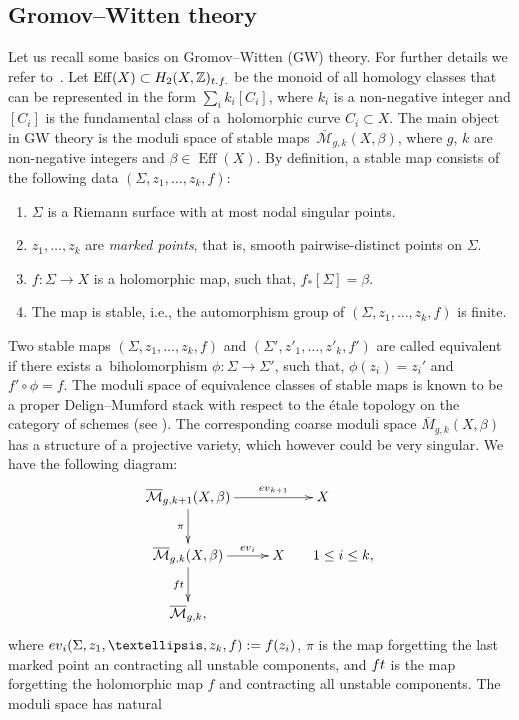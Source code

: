 \documentclass[10pt,a4paper]{article}
\numberwithin{equation}{section}
\newcommand{\ZZ}{\mathbb{Z}}
\newcommand{\M}{\mathcal{M}}
\begin{document}
\subsection{Gromov--Witten theory}\label{sec:GW}
Let us recall some basics on Gromov--Witten (GW) theory. For
further details we refer to~\cite{Ma}. Let
$\operatorname{Eff}(X)\subset H_2(X,\ZZ)_{\rm t.f.}$ be the monoid of all homology
classes that can be represented in the form $\sum_i k_i [C_i]$, where
$k_i$ is a non-negative integer and $[C_i]$ is the fundamental class
of a~holomorphic curve $C_i\subset X$. The
main object in GW theory is the moduli space of stable maps~$\overline{\M}_{g,k}(X,\beta)$, where $g$, $k$ are non-negative integers
and $\beta\in \operatorname{Eff}(X)$. By definition, a stable map
consists of the following data $(\Sigma, z_1,\dots,z_k, f)$:
\begin{enumerate}\itemsep=0pt
\item[(1)]
 $\Sigma$ is a Riemann surface with at most nodal
 singular points.
\item[(2)]
 $z_1,\dots,z_k$ are {\em marked points}, that is, smooth
 pairwise-distinct points on $\Sigma$.
\item[(3)]
 $f\colon \Sigma \to X$ is a holomorphic map, such that, $f_*[\Sigma]=\beta$.
\item[(4)]
 The map is stable, i.e., the automorphism group of
 $(\Sigma,z_1,\dots,z_k,f)$ is finite.
\end{enumerate}
Two stable maps $(\Sigma,z_1,\dots,z_k,f)$ and
$(\Sigma',z'_1,\dots,z'_k,f')$ are called equivalent if there exists a~biholomorphism $\phi\colon\Sigma\to \Sigma'$, such that, $\phi(z_i)=z_i'$
and $f'\circ \phi = f$. The moduli space of equivalence classes of
stable maps is known to be a proper
Delign--Mumford stack with respect to the \'etale topology on the
category of schemes (see \cite{BeMa}). The corresponding coarse moduli space
$\overline{M}_{g,k}(X,\beta)$ has a structure of a projective variety,
which however could be very singular. We have the following diagram:
\[
\xymatrix{
 \overline{\M}_{g,k+1} (X,\beta) \ar[r]^-{{\rm ev}_{k+1}} \ar[d]_\pi & X \\
 \overline{\M}_{g,k} (X,\beta) \ar[r]^-{{\rm ev}_{i} } \ar[d]_{{\rm
 ft}} & X \qquad 1\leq i\leq k,\\
 \overline{\M}_{g,k}, &
}
\]
where ${\rm ev}_i(\Sigma,z_1,\dots,z_k,f) := f(z_i)$, $\pi$ is the map
forgetting the last marked point an contracting all unstable
components, and ${\rm ft}$ is the map forgetting the holomorphic map
$f$ and contracting all unstable components. The moduli space has natural
\end{document}
